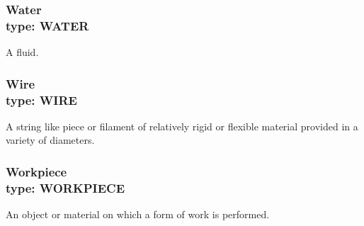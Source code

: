 \subsubsection[Water]{Water \\ {\small type: WATER}}
\label{sec:Water}



A fluid.


\subsubsection[Wire]{Wire \\ {\small type: WIRE}}
\label{sec:Wire}



A string like piece or filament of relatively rigid or flexible material provided in a variety of diameters.


\subsubsection[Workpiece]{Workpiece \\ {\small type: WORKPIECE}}
\label{sec:Workpiece}



An object or material on which a form of work is performed.

